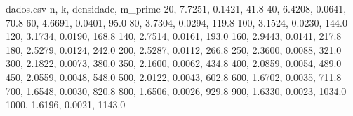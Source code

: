 \pgfplotsset{compat=1.18}

\begin{filecontents*}{dados.csv}
n, k, densidade, m_prime
20, 7.7251, 0.1421, 41.8
40, 6.4208, 0.0641, 70.8
60, 4.6691, 0.0401, 95.0
80, 3.7304, 0.0294, 119.8
100, 3.1524, 0.0230, 144.0
120, 3.1734, 0.0190, 168.8
140, 2.7514, 0.0161, 193.0
160, 2.9443, 0.0141, 217.8
180, 2.5279, 0.0124, 242.0
200, 2.5287, 0.0112, 266.8
250, 2.3600, 0.0088, 321.0
300, 2.1822, 0.0073, 380.0
350, 2.1600, 0.0062, 434.8
400, 2.0859, 0.0054, 489.0
450, 2.0559, 0.0048, 548.0
500, 2.0122, 0.0043, 602.8
600, 1.6702, 0.0035, 711.8
700, 1.6548, 0.0030, 820.8
800, 1.6506, 0.0026, 929.8
900, 1.6330, 0.0023, 1034.0
1000, 1.6196, 0.0021, 1143.0
\end{filecontents*}

